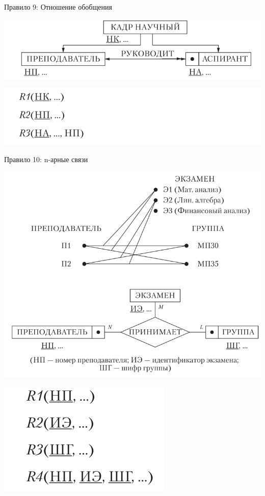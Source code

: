 \documentclass{beamer}
\begin{document}
\begin{frame}{Правило 9: Отношение обобщения}
\begin{center}
\includegraphics[scale=0.5]{images/lec03-pic24.png}
\end{center}
\begin{center}
\includegraphics[scale=0.5]{images/lec03-pic25.png}
\end{center}
\end{frame}

\begin{frame}{Правило 10: n-арные связи}
\begin{center}
\includegraphics[scale=0.3]{images/lec03-pic26.png}
\end{center}
\begin{center}
\includegraphics[scale=0.4]{images/lec03-pic27.png}
\end{center}
\end{frame}
\end{document}
